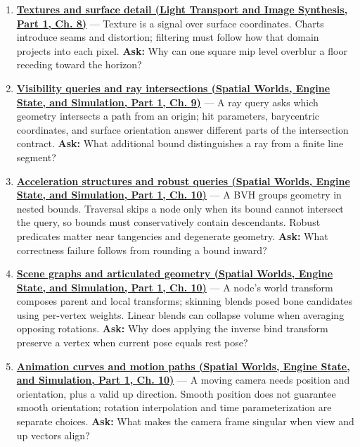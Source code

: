 \begin{enumerate}
\item
  \textbf{\href{../04-Light-Transport-and-Image-Synthesis-P01/main.pdf\#03-visual-computing-i-ch019-textures-and-surface-detail}{Textures and surface detail (Light Transport and Image Synthesis, Part 1, Ch. 8)}} --- Texture is a signal over surface coordinates. Charts introduce seams and distortion; filtering must follow how that domain projects into each pixel. \textbf{Ask:} Why can one square mip level overblur a floor receding toward the horizon?
\item
  \textbf{\href{../05-Spatial-Worlds-Engine-State-and-Simulation-P01/main.pdf\#04-visual-computing-ii-ch028-visibility-queries-and-ray-intersections-1}{Visibility queries and ray intersections (Spatial Worlds, Engine State, and Simulation, Part 1, Ch. 9)}} --- A ray query asks which geometry intersects a path from an origin; hit parameters, barycentric coordinates, and surface orientation answer different parts of the intersection contract. \textbf{Ask:} What additional bound distinguishes a ray from a finite line segment?
\item
  \textbf{\href{../05-Spatial-Worlds-Engine-State-and-Simulation-P01/main.pdf\#04-visual-computing-ii-ch029-acceleration-structures-and-robust-queries-1}{Acceleration structures and robust queries (Spatial Worlds, Engine State, and Simulation, Part 1, Ch. 10)}} --- A BVH groups geometry in nested bounds. Traversal skips a node only when its bound cannot intersect the query, so bounds must conservatively contain descendants. Robust predicates matter near tangencies and degenerate geometry. \textbf{Ask:} What correctness failure follows from rounding a bound inward?
\item
  \textbf{\href{../05-Spatial-Worlds-Engine-State-and-Simulation-P01/main.pdf\#04-visual-computing-ii-ch029-scene-graphs-and-articulated-geometry}{Scene graphs and articulated geometry (Spatial Worlds, Engine State, and Simulation, Part 1, Ch. 10)}} --- A node's world transform composes parent and local transforms; skinning blends posed bone candidates using per-vertex weights. Linear blends can collapse volume when averaging opposing rotations. \textbf{Ask:} Why does applying the inverse bind transform preserve a vertex when current pose equals rest pose?
\item
  \textbf{\href{../05-Spatial-Worlds-Engine-State-and-Simulation-P01/main.pdf\#04-visual-computing-ii-ch029-animation-curves-and-motion-paths}{Animation curves and motion paths (Spatial Worlds, Engine State, and Simulation, Part 1, Ch. 10)}} --- A moving camera needs position and orientation, plus a valid up direction. Smooth position does not guarantee smooth orientation; rotation interpolation and time parameterization are separate choices. \textbf{Ask:} What makes the camera frame singular when view and up vectors align?

\end{enumerate}
